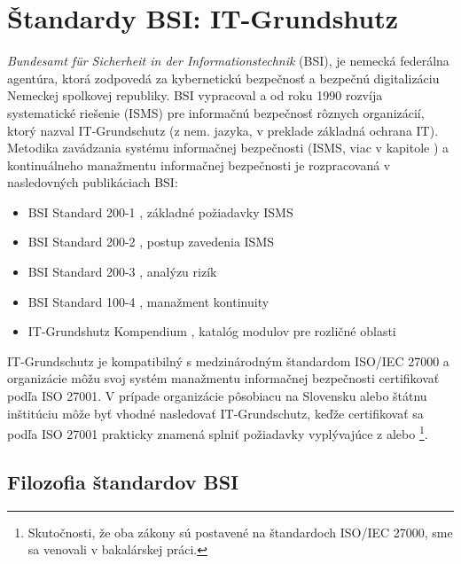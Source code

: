\chapter{Štandardy BSI: IT-Grundshutz}
\label{chap:it-grundschutz}
\emph{Bundesamt für Sicherheit in der Informationstechnik} (BSI), je nemecká federálna agentúra,
ktorá zodpovedá za kybernetickú bezpečnosť a bezpečnú digitalizáciu Nemeckej spolkovej republiky\cite{bsibundde}.
BSI vypracoval a od roku 1990 rozvíja systematické riešenie (ISMS) pre informačnú bezpečnosť rôznych organizácií,
ktorý nazval IT-Grundschutz (z nem. jazyka, v preklade základná ochrana IT). Metodika zavádzania systému informačnej
bezpečnosti (ISMS, viac v kapitole ) a kontinuálneho manažmentu informačnej bezpečnosti je rozpracovaná
v nasledovných publikáciach BSI:

\begin{itemize}[nosep]
    \item BSI Standard 200-1 \cite{BSI1}, základné požiadavky ISMS
    \item BSI Standard 200-2 \cite{BSI2}, postup zavedenia ISMS
    \item BSI Standard 200-3 \cite{BSI3}, analýzu rizík
    \item BSI Standard 100-4 \cite{BSI4}, manažment kontinuity
    \item IT-Grundshutz Kompendium \cite{GSK}, katalóg modulov pre rozličné oblasti
\end{itemize}

IT-Grundschutz je kompatibilný s medzinárodným štandardom ISO/IEC 27000 a organizácie môžu svoj systém manažmentu
informačnej bezpečnosti certifikovať podľa ISO 27001. V prípade organizácie pôsobiacu na Slovensku alebo štátnu
inštitúciu môže byť vhodné nasledovať IT-Grundschutz, keďže certifikovať sa podľa ISO 27001 prakticky znamená splniť
požiadavky vyplývajúce z \cite{ZoKB} alebo \cite{ZoITVS}\footnote{Skutočnosti, že oba zákony sú postavené na štandardoch
ISO/IEC 27000, sme sa venovali v bakalárskej práci.}.


\section{Filozofia štandardov BSI}
\label{sec:bsiphilosophy}


